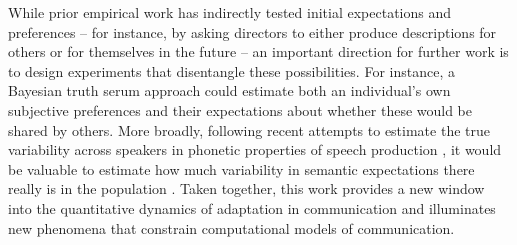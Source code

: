 \documentclass[alpha-refs]{wiley-article}
\begin{document}
While prior empirical work has indirectly tested initial expectations and  preferences -- for instance, by asking directors to either produce descriptions for others or for themselves in the future \citep{FussellKrauss89_IntendedAudienceCommonGround} -- an important direction for further work is to design experiments that disentangle these possibilities.
For instance, a Bayesian truth serum approach \citep{prelec2004bayesian} could estimate both an individual's own subjective preferences and their expectations about whether these would be shared by others.
More broadly, following recent attempts to estimate the true variability across speakers in phonetic properties of speech production \citep{kleinschmidt2019structure}, it would be valuable to estimate how much variability in semantic expectations there really is in the population \citep{FurnasEtAl87_VocabularyProblem}.
Taken together, this work provides a new window into the quantitative dynamics of adaptation in communication and illuminates new phenomena that constrain computational models of communication. 
%

\printendnotes




\end{document}
